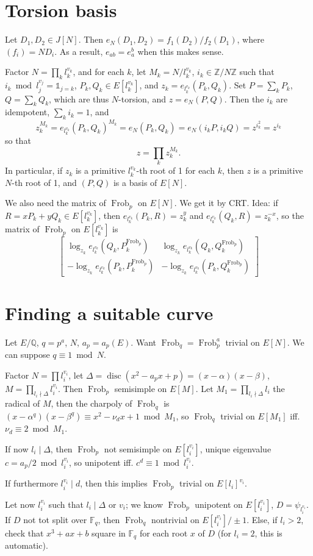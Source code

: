 \documentclass[12pt]{article}
\newcommand{\Z}{\mathbb{Z}}
\newcommand{\Q}{\mathbb{Q}}
\newcommand{\F}{\mathbb{F}}
\newcommand{\disc}{\operatorname{disc}}
\newcommand{\Frob}{\operatorname{Frob}}
\theoremstyle{definition}
\begin{document}
\section{Torsion basis}

Let $D_1, D_2 \in J[N]$. Then $e_N(D_1,D_2) = f_1(D_2)/f_2(D_1)$, where $(f_i) = N D_i$. As a result, $e_{ab} = e_a^b$ when this makes sense.

Factor $N = \prod_k l_k^{v_k}$, and for each $k$, let $M_k = N/l_k^{v_k}$, $i_k \in \Z/N\Z$ such that $i_k \bmod l_j^{v_j} = \mathds{1}_{j=k}$, $P_k, Q_k \in E[l_k^{v_k}]$, and $z_k = e_{l_k^{v_k}}(P_k,Q_k)$. Set $P = \sum_k P_k$, $Q = \sum_k Q_k$, which are thus $N$-torsion, and $z=e_N(P,Q)$. Then the $i_k$ are idempotent, $\sum_k i_k = 1$, and
\[ z_k^{M_k} = e_{l_k^{v_k}}(P_k,Q_k)^{M_k} = e_N(P_k,Q_k) = e_N(i_k P, i_k Q) = z ^{i_k^2} = z^{i_k} \]
so that
\[ z = \prod_k z_k^{M_k}. \]
In particular, if $z_k$ is a primitive $l_k^{v_k}$-th root of 1 for each $k$, then $z$ is a primitive $N$-th root of 1, and $(P,Q)$ is a basis of $E[N]$.

We also need the matrix of $\Frob_p$ on $E[N]$. We get it by CRT. Idea: if $R = x P_k + y Q_k \in E[l_k^{v_k}]$, then $e_{l_k^{v_k}}(P_k,R) = z_k^y$ and $e_{l_k^{v_k}}(Q_k,R) = z_k^{-x}$, so the matrix of $\Frob_p$ on $E[l_k^{v_k}]$ is
\[ \left[ \begin{matrix} \log_{z_k} e_{l_k^{v_k}}(Q_k,P_k^{\Frob_p}) & \log_{z_k} e_{l_k^{v_k}}(Q_k,Q_k^{\Frob_p}) \\ -\log_{z_k} e_{l_k^{v_k}}(P_k,P_k^{\Frob_p}) & -\log_{z_k} e_{l_k^{v_k}}(P_k,Q_k^{\Frob_p}) \end{matrix} \right] \]

\section{Finding a suitable curve}

Let $E/\Q$, $q=p^a$, $N$, $a_p=a_p(E)$. Want $\Frob_q = \Frob_p^a$ trivial on $E[N]$. We can suppose $q \equiv 1 \bmod N$.

Factor $N = \prod l_i^{v_i}$, let $\Delta = \disc(x^2-a_p x+p)=(x-\alpha)(x-\beta)$, $M = \prod_{l_i \nmid \Delta} l_i^{v_i}$. Then $\Frob_p$ semisimple on $E[M]$. Let $M_1 = \prod_{l_i \nmid \Delta} l_i$ the radical of $M$, then the charpoly of $\Frob_q$ is $(x-\alpha^q)(x-\beta^q) \equiv x^2-\nu_d x + 1 \bmod M_1$, so $\Frob_q$ trivial on $E[M_1]$ iff. $\nu_d \equiv 2 \bmod M_1$.

If now $l_i \mid \Delta$, then $\Frob_p$ not semisimple on $E[l_i^{v_i}]$, unique eigenvalue $c = a_p/2 \bmod l_i^{v_i}$, so unipotent iff. $c^d \equiv 1 \bmod l_i^{v_i}$.

If furthermore $l_i^{v_i} \mid d$, then this implies $\Frob_p$ trivial on $E[l_i]^{v_i}$.

Let now $l_i^{v_i}$ such that $l_i \mid \Delta$ or $v_i$; we know $\Frob_p$ unipotent on $E[l_i^{v_i}]$, $D=\psi_{l_i^{v_i}}$. If $D$ not tot split over $\F_q$, then $\Frob_q$ nontrivial on $E[l_i^{v_i}]/\pm1$. Else, if $l_i > 2$, check that $x^3+ax+b$ square in $\F_q$ for each root $x$ of $D$ (for $l_i=2$, this is automatic). 
\end{document}
